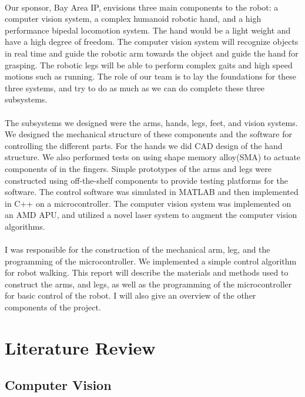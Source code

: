 \documentclass[titlepage,letterpaper,12pt]{article}
\begin{document}
\paragraph{}Our sponsor, Bay Area IP, envisions three main components to the
robot: a computer vision system, a complex humanoid robotic hand, and a high
performance bipedal locomotion system. The hand would be a light weight and have
a high degree of freedom. The computer vision system will recognize objects in
real time and guide the robotic arm towards the object and guide the hand for
grasping. The robotic legs will be able to perform complex gaits and high speed
motions such as running. The role of our team is to lay the foundations for
these three systems, and try to do as much as we can do complete these three
subsystems.

\paragraph{}The subsystems we designed were the arms, hands, legs, feet, and
vision systems.  We designed the mechanical structure of these components and
the software for controlling the different parts. For the hands we did CAD
design of the hand structure. We also performed tests on using shape memory
alloy(SMA) to actuate components of in the fingers. Simple prototypes of the
arms and legs were constructed using off-the-shelf components to provide testing
platforms for the software. The control software was simulated in MATLAB and
then implemented in C++ on a microcontroller. The computer vision system was
implemented on an AMD APU, and utilized a novel laser system to augment the
computer vision algorithms.

\paragraph{}I was responsible for the construction of the mechanical arm, leg,
and the programming of the microcontroller. We implemented a simple control
algorithm for robot walking. This report will describe the materials and methods
used to construct the arms, and legs, as well as the programming of the
microcontroller for basic control of the robot. I will also give an overview of
the other components of the project.

\section{Literature Review}
\subsection{Computer Vision}
\end{document}
